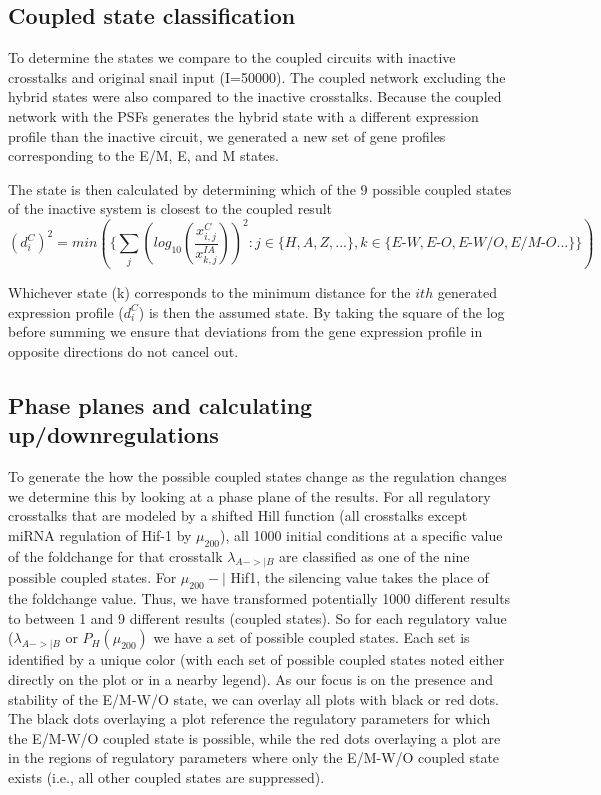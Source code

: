 \documentclass{article}
\begin{document}
\subsection{Coupled state classification}
To determine the states we compare to the coupled circuits with inactive crosstalks and original snail input (I=50000). 
The coupled network excluding the hybrid states were also compared to the inactive crosstalks. 
Because the coupled network with the PSFs generates the hybrid state with a different expression profile than the inactive circuit, we generated a new set of gene profiles corresponding to the E/M, E, and M states. 

The state is then calculated by determining which of the 9 possible coupled states of the inactive system is closest to the coupled result
\begin{equation}
(d_i^C)^2 = min(\{ \sum_j (log_{10}(\frac{x_{i,j}^C}{ x_{k,j}^{IA}}))^2 : j\in \{H,A,Z,... \} , k\in \{E\textrm{-}W,E\textrm{-}O, E\textrm{-}W/O, E/M\textrm{-}O...\}\} )
\end{equation}

Whichever state (k) corresponds to the minimum distance for the $ith$ generated expression profile ($d_i^C$) is then the assumed state. 
By taking the square of the log before summing we ensure that deviations from the gene expression profile in opposite directions do not cancel out.

\subsection{Phase planes and calculating up/downregulations}
To generate the how the possible coupled states change as the regulation changes we determine this by looking at a phase plane of the results.
For all regulatory crosstalks that are modeled by a shifted Hill function (all crosstalks except miRNA regulation of Hif-1 by $\mu_{200}$), all 1000 initial conditions at a specific value of the foldchange for that crosstalk $\lambda_{A->|B}$ are classified as one of the nine possible coupled states.
For $\mu_{200}-|$ Hif1, the silencing value takes the place of the foldchange value. 
Thus, we have transformed potentially 1000 different  results to between 1 and 9 different results (coupled states). 
So for each regulatory value ($\lambda_{A->|B}$ or $P_H(\mu_{200})$ we have a set of possible coupled states. 
Each set is identified by a unique color (with each set of possible coupled states noted either directly on the plot or in a nearby legend).
As our focus is on the presence and stability of the E/M-W/O state, we can overlay all plots with black or red dots. 
The black dots overlaying a plot reference the regulatory parameters for which the E/M-W/O coupled state is possible, while the red dots overlaying a plot are in the regions of regulatory parameters where only the E/M-W/O coupled state exists (i.e., all other coupled states are suppressed).
\end{document}
